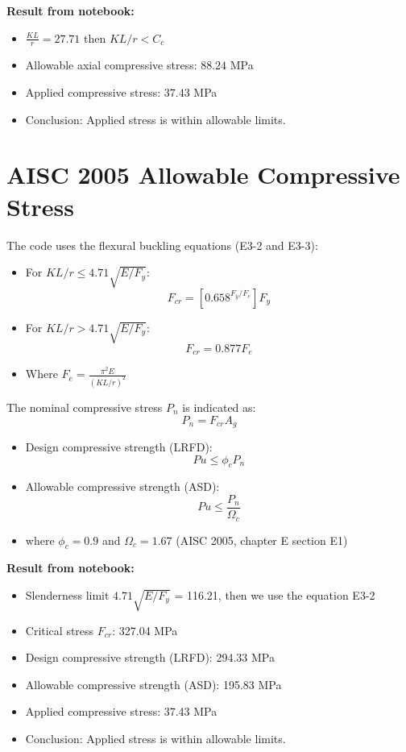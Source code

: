 \documentclass[12pt]{article}
\begin{document}
\noindent \textbf{Result from notebook:}
\begin{itemize}
    \item $\frac{KL}{r} = 27.71$ then $KL/r < C_c$ 
    \item Allowable axial compressive stress: $88.24$ MPa 
    \item Applied compressive stress: $37.43$ MPa
    \item Conclusion: Applied stress is within allowable limits.
\end{itemize}

\section*{AISC 2005 Allowable Compressive Stress}
The code uses the flexural buckling equations (E3-2 and E3-3):

\begin{itemize}
    \item For $KL/r \leq 4.71\sqrt{E/F_y}$:
    \begin{equation*}
        F_{cr} = [0.658^{F_y/F_e}] F_y
    \end{equation*}
    \item For $KL/r > 4.71\sqrt{E/F_y}$:
    \begin{equation*}
        F_{cr} = 0.877 F_e
    \end{equation*}
    \item Where $F_e = \frac{\pi^2 E}{(KL/r)^2}$
\end{itemize}

\noindent The nominal compressive stress $P_{n}$ is indicated as:
\[
P_{n} = F_{cr} A_{g}
\]
\begin{itemize}
    \item Design compressive strength (LRFD): 
    \begin{equation*}
        P{u} \le \phi_{c} P_{n}
    \end{equation*}
    \item Allowable compressive strength (ASD):
    \begin{equation*}
        P{u} \le \frac{P_{n}}{\Omega_{c}}
    \end{equation*}
    \item where $\phi_{c} = 0.9$ and $\Omega_{c} = 1.67$ (AISC 2005, chapter E section E1)
\end{itemize}

\noindent \textbf{Result from notebook:}
\begin{itemize}
    \item Slenderness limit $4.71\sqrt{E/F_{y}}$ = 116.21, then we use the equation E3-2 
    \item Critical stress $F_{cr}$: 327.04 MPa
    \item Design compressive strength (LRFD): 294.33 MPa
    \item Allowable compressive strength (ASD): 195.83 MPa
    \item Applied compressive stress: 37.43 MPa
    \item Conclusion: Applied stress is within allowable limits.
\end{itemize}
\end{document}
